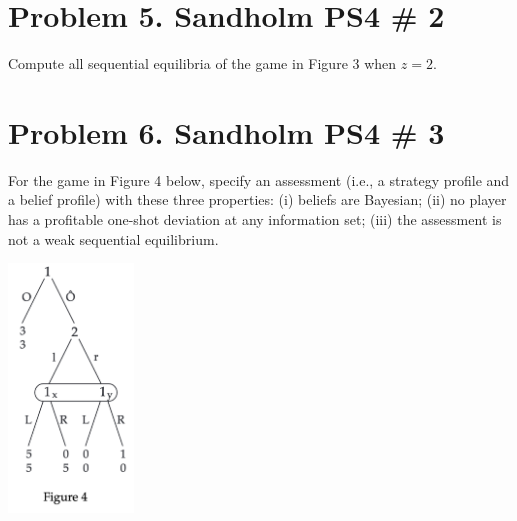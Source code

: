 \documentclass[10pt, a4paper]{article}
\begin{document}
\section*{Problem 5. Sandholm PS4 \# 2}
  Compute all sequential equilibria of the game in Figure 3 when $z=2$.
\section*{Problem 6. Sandholm PS4 \# 3}
  For the game in Figure 4 below, specify an assessment (i.e., a strategy profile and a belief profile) with these three properties: (i) beliefs are Bayesian; (ii) no player has a profitable one-shot deviation at any information set; (iii) the assessment is not a weak sequential equilibrium.
  \begin{center}
    \includegraphics[width = 0.25\textwidth]{fig4.png}
  \end{center}
\end{document}
